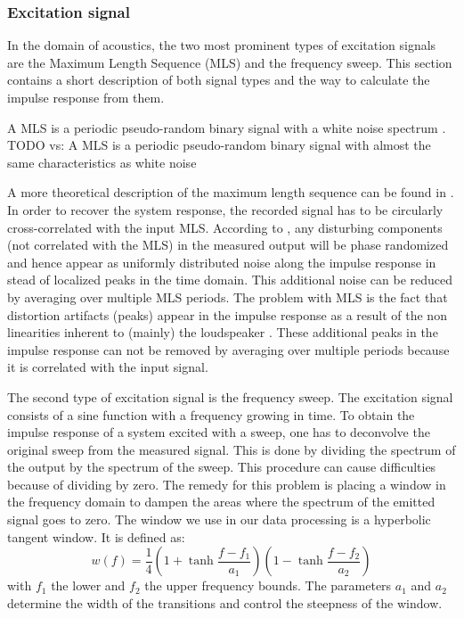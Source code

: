 \subsubsection{Excitation signal}\label{exc}
In the domain of acoustics, the two most prominent types of excitation signals are the Maximum Length Sequence (MLS) and the frequency sweep.
This section contains a short description of both signal types and the way to calculate the impulse response from them. 


A MLS is a periodic pseudo-random binary signal with a white noise spectrum \cite{Stan}.
{\huge TODO vs:}
A MLS is a periodic pseudo-random binary signal with almost the same characteristics as white noise

A more theoretical description of the maximum length sequence can be found in \cite{mls}.  In order to recover the system response, the recorded signal has to be circularly cross-correlated with the input MLS. According to \cite{Stan}, any disturbing components (not correlated with the MLS) in the measured output will be phase randomized and hence appear as uniformly distributed noise along the impulse response in stead of localized peaks in the time domain. This additional noise can be reduced by averaging over multiple MLS periods. The problem with MLS is the fact that distortion artifacts (peaks) appear in the impulse response as a result of the non linearities inherent to (mainly) the loudspeaker \cite{Geetere}. These additional peaks in the impulse response can not be removed by averaging over multiple periods because it is correlated with the input signal.

The second type of excitation signal is the frequency sweep. The excitation signal consists of a sine function with a frequency growing in time. To obtain the impulse response of a system excited with a sweep, one has to deconvolve the original sweep from the measured signal. This is done by dividing the spectrum of the output by the spectrum of the sweep. This procedure can cause difficulties because of dividing by zero. The remedy for this problem is placing a window in the frequency domain to dampen the areas where the spectrum of the emitted signal goes to zero. The window we use in our data processing is a hyperbolic tangent window. It is defined as:
\[
w(f) = \frac{1}{4}\left(1 + \tanh \frac{f - f_1}{a_1}\right)
		\left(1 - \tanh \frac{f - f_2}{a_2}\right)
\]
with $f_1$ the lower and $f_2$ the upper frequency bounds. The parameters $a_1$ and $a_2$ determine the width of the transitions and control the steepness of the window.

